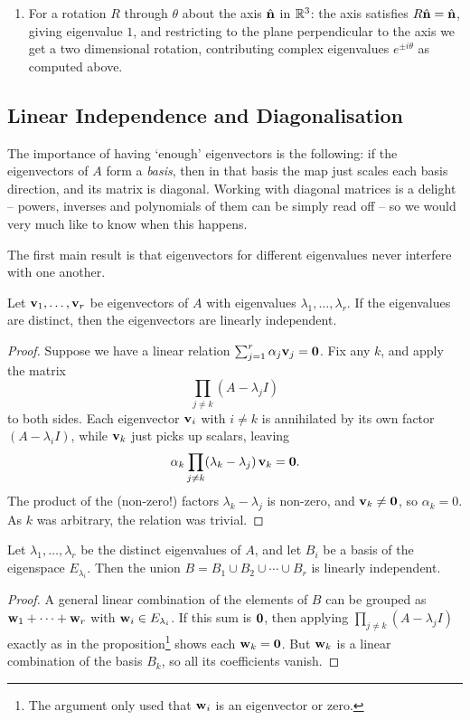 \documentclass[a4paper]{scrartcl}
\begin{document}
\begin{example}[Multiplicities]
\begin{enumerate}[label=(\roman*)]
		\item For a rotation $R$ through $\theta$ about the axis $\hat{\mathbf{n}}$ in $\mathbb{R}^3$: the axis satisfies $R \hat{\mathbf{n}} = \hat{\mathbf{n}}$, giving eigenvalue $1$, and restricting to the plane perpendicular to the axis we get a two dimensional rotation, contributing complex eigenvalues $e^{\pm i \theta}$ as computed above.
	\end{enumerate}
\end{example}

\subsection{Linear Independence and Diagonalisation}

The importance of having `enough' eigenvectors is the following: if the eigenvectors of $A$ form a \emph{basis}, then in that basis the map just scales each basis direction, and its matrix is diagonal. Working with diagonal matrices is a delight -- powers, inverses and polynomials of them can be simply read off -- so we would very much like to know when this happens.

The first main result is that eigenvectors for different eigenvalues never interfere with one another.

\begin{proposition}
	Let $\mathbf{v}_1, \dots, \mathbf{v}_r$ be eigenvectors of $A$ with eigenvalues $\lambda_1, \dots, \lambda_r$. If the eigenvalues are distinct, then the eigenvectors are linearly independent.
\end{proposition}
\begin{proof}
	Suppose we have a linear relation $\sum_{j = 1}^r \alpha_j \mathbf{v}_j = \mathbf{0}$. Fix any $k$, and apply the matrix
	$$
	\prod_{j \neq k}(A - \lambda_j I)
	$$
	to both sides. Each eigenvector $\mathbf{v}_i$ with $i \neq k$ is annihilated by its own factor $(A - \lambda_i I)$, while $\mathbf{v}_k$ just picks up scalars, leaving
	$$
	\alpha_k \prod_{j \neq k}(\lambda_k - \lambda_j) \, \mathbf{v}_k = \mathbf{0}.
	$$
	The product of the (non-zero!) factors $\lambda_k - \lambda_j$ is non-zero, and $\mathbf{v}_k \neq \mathbf{0}$, so $\alpha_k = 0$. As $k$ was arbitrary, the relation was trivial.
\end{proof}

\begin{corollary}\label{cor:eigenbases}
	Let $\lambda_1, \dots, \lambda_r$ be the distinct eigenvalues of $A$, and let $B_i$ be a basis of the eigenspace $E_{\lambda_i}$. Then the union $B = B_1 \cup B_2 \cup \cdots \cup B_r$ is linearly independent.
\end{corollary}
\begin{proof}
	A general linear combination of the elements of $B$ can be grouped as $\mathbf{w}_1 + \cdots + \mathbf{w}_r$ with $\mathbf{w}_i \in E_{\lambda_i}$. If this sum is $\mathbf{0}$, then applying $\prod_{j \neq k}(A - \lambda_jI)$ exactly as in the proposition\footnote{The argument only used that $\mathbf{w}_i$ is an eigenvector or zero.} shows each $\mathbf{w}_k = \mathbf{0}$. But $\mathbf{w}_k$ is a linear combination of the basis $B_k$, so all its coefficients vanish.
\end{proof}
\end{document}
